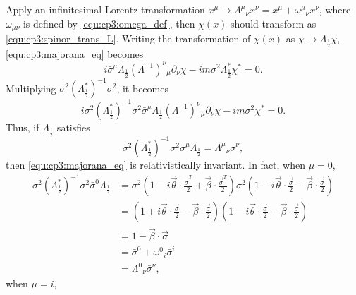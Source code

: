 \solution
\begin{problembody}
    \item Apply an infinitesimal Lorentz transformation $x^\mu \to \Lambda^\mu{}_\nu x^\nu = x^\mu + \omega^\mu{}_\nu x^\nu$, where $\omega_{\mu\nu}$ is defined by \eqref{equ:cp3:omega_def}, then
    $\chi(x)$ should transform as \eqref{equ:cp3:spinor_trans_L}. Writing the transformation of $\chi(x)$ as $\chi \to \Lambda_{\frac{1}{2}}\chi$, \eqref{equ:cp3:majorana_eq} 
    becomes
    \begin{equation*}
        i\bar{\sigma}^\mu \Lambda_{\frac{1}{2}} (\Lambda^{-1})^\nu{}_\mu \partial_\nu\chi - im\sigma^2\Lambda_{\frac{1}{2}}^\ast \chi^\ast = 0.
    \end{equation*}
    Multiplying $\sigma^2(\Lambda_{\frac{1}{2}}^\ast)^{-1}\sigma^2$, it becomes
    \begin{equation*}
        i\sigma^2(\Lambda_{\frac{1}{2}}^\ast)^{-1}\sigma^2\bar{\sigma}^\mu\Lambda_{\frac{1}{2}}(\Lambda^{-1})^\nu{}_\mu\partial_\nu\chi - im\sigma^2\chi^\ast = 0.
    \end{equation*}
    Thus, if $\Lambda_{\frac{1}{2}}$ satisfies
    \begin{equation}\label{equ:cp3:rela_cond}
        \sigma^2(\Lambda_{\frac{1}{2}}^\ast)^{-1}\sigma^2\bar{\sigma}^\mu \Lambda_{\frac{1}{2}} = \Lambda^\mu{}_\nu\bar{\sigma}^\nu,
    \end{equation}
    then \eqref{equ:cp3:majorana_eq} is relativistically invariant. In fact, when $\mu = 0$,
    \begin{align*}
        \sigma^2(\Lambda_{\frac{1}{2}}^\ast)^{-1}\sigma^2\bar{\sigma}^0 \Lambda_{\frac{1}{2}}
        & = \sigma^2\left(1 - i\vec{\theta}\cdot\frac{\vec{\sigma}^T}{2} + \vec{\beta}\cdot\frac{\vec{\sigma}^T}{2}\right)\sigma^2
        \left(1 - i\vec{\theta}\cdot\frac{\vec{\sigma}}{2} - \vec{\beta}\cdot\frac{\vec{\sigma}}{2}\right) \\
        & = \left(1 + i\vec{\theta}\cdot\frac{\vec{\sigma}}{2} - \vec{\beta}\cdot\frac{\vec{\sigma}}{2}\right) 
        \left(1 - i\vec{\theta}\cdot\frac{\vec{\sigma}}{2} - \vec{\beta}\cdot\frac{\vec{\sigma}}{2}\right) \\
        & = 1 - \vec{\beta}\cdot\vec{\sigma}\\
        & = \bar{\sigma}^0 + \omega^0{}_i \bar{\sigma}^i \\
        & = \Lambda^0{}_\nu \bar{\sigma}^\nu,
    \end{align*}
    when $\mu = i$,
    \begin{align*}

\end{align*}
\end{problembody}
